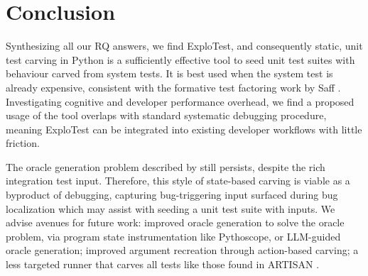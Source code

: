 \section{Conclusion}


Synthesizing all our RQ answers, we find ExploTest, and consequently static, unit test carving in Python is a sufficiently
effective tool to seed unit test suites with behaviour carved from system tests. It is best used when the system test is already
expensive, consistent with the formative test factoring work by Saff \cite*{saff2005automatic,saff2004mock}. Investigating cognitive
and developer performance overhead, we find a proposed usage of the tool overlaps with standard systematic debugging procedure,
meaning ExploTest can be integrated into existing developer workflows with little friction.

The oracle generation problem described by \cite{barr2014oracle} still persists, despite the rich integration test input.
Therefore, this style of state-based
carving is viable as a byproduct of debugging, capturing bug-triggering input surfaced during bug localization which
may assist with seeding a unit test suite with inputs. We advise avenues for future work: improved oracle generation to
solve the oracle problem, via program state instrumentation like Pythoscope, or LLM-guided oracle generation; improved
argument recreation through action-based carving; a less targeted runner that carves all tests like those found in ARTISAN \cite{gambi2023action}.